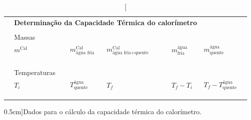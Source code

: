 \begin{table}[!ht]
\centering
	\begin{tabular}{lp{22mm}p{22mm}p{22mm}lp{22mm}p{22mm}l}
		\toprule
		&\multicolumn{5}{l}{\textbf{Determinação da Capacidade Térmica do calorímetro}}\\
		\\
		\cmidrule{2-7}
		& Massas & \\
		\cmidrule{2-7}
		& $m^{\text{Cal}}$ & $m^{\text{Cal}}_{\text{água fria}}$ & $m^{\text{Cal}}_{\text{água fria+quente}}$ & & $m_{\text{fria}}^{\text{água}}$ & $m_{\text{quente}}^{\text{água}}$ & \\
		\cmidrule{2-4}\cmidrule{6-7}
		& \cellcolor[gray]{0.95} & \cellcolor[gray]{0.97} & \cellcolor[gray]{0.95} & & \cellcolor[gray]{0.95} & \cellcolor[gray]{0.97} & \\
		& \cellcolor[gray]{0.89} & \cellcolor[gray]{0.92} & \cellcolor[gray]{0.89} & & \cellcolor[gray]{0.89} & \cellcolor[gray]{0.92} & \\
		& \cellcolor[gray]{0.95} & \cellcolor[gray]{0.97} & \cellcolor[gray]{0.95} & & \cellcolor[gray]{0.95} & \cellcolor[gray]{0.97} & \\
		\cmidrule{2-7}
		\\
		& Temperaturas \\
		\cmidrule{2-7}
		& $T_{i}$ & $T^{\text{água}}_{\text{quente}}$ & $T_{f}$ & & $T_f - T_i$ & $T_f - T^{\text{água}}_{\text{quente}}$ \\
		\cmidrule{2-4} \cmidrule{6-7}
		& \cellcolor[gray]{0.95} & \cellcolor[gray]{0.97} & \cellcolor[gray]{0.95} & & \cellcolor[gray]{0.95} & \cellcolor[gray]{0.97} & \\
		& \cellcolor[gray]{0.89} & \cellcolor[gray]{0.92} & \cellcolor[gray]{0.89} & & \cellcolor[gray]{0.89} & \cellcolor[gray]{0.92} & \\
        & \cellcolor[gray]{0.95} & \cellcolor[gray]{0.97} & \cellcolor[gray]{0.95} & & \cellcolor[gray]{0.95} & \cellcolor[gray]{0.97} & \\
		\cmidrule{2-7}
		\bottomrule
	\end{tabular}
	\caption[][0.5cm]{Dados para o cálculo da capacidade térmica do calorímetro.}
	\label{Tab:CapacidadeTermica}
\end{table}
\vspace{2cm}
